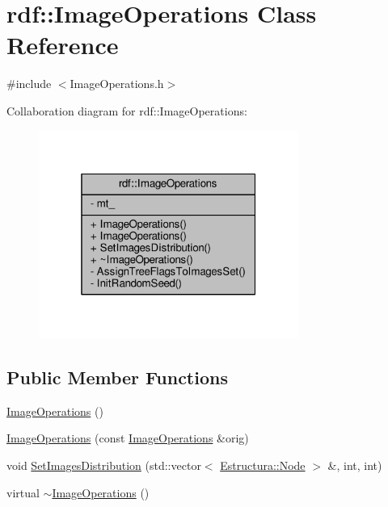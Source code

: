 \hypertarget{classrdf_1_1ImageOperations}{}\section{rdf\+:\+:Image\+Operations Class Reference}
\label{classrdf_1_1ImageOperations}


{\ttfamily \#include $<$Image\+Operations.\+h$>$}



Collaboration diagram for rdf\+:\+:Image\+Operations\+:
\nopagebreak
\begin{figure}[H]
\begin{center}
\leavevmode
\includegraphics[width=241pt]{classrdf_1_1ImageOperations__coll__graph}
\end{center}
\end{figure}
\subsection*{Public Member Functions}
\begin{DoxyCompactItemize}
\item 
\hyperlink{classrdf_1_1ImageOperations_aa002ef8c8043e4bcff91058206dfa2fd}{Image\+Operations} ()
\item 
\hyperlink{classrdf_1_1ImageOperations_ab125b701dc20455468305ff1c71e33e9}{Image\+Operations} (const \hyperlink{classrdf_1_1ImageOperations}{Image\+Operations} \&orig)
\item 
void \hyperlink{classrdf_1_1ImageOperations_a0058a30a2dc6063bc60ce893fd714b10}{Set\+Images\+Distribution} (std\+::vector$<$ \hyperlink{structEstructura_1_1Node}{Estructura\+::\+Node} $>$ \&, int, int)
\item 
virtual \hyperlink{classrdf_1_1ImageOperations_a12ddf1b0e39dc483d20273123fdf6b06}{$\sim$\+Image\+Operations} ()
\end{DoxyCompactItemize}
